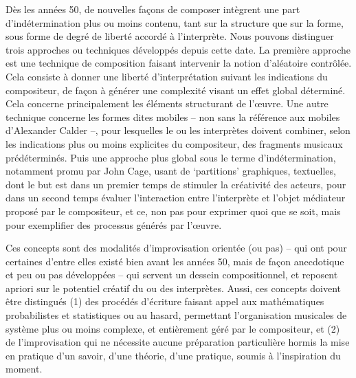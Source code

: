 \documentclass{article}
\begin{document}
Dès les années 50, de nouvelles façons de composer intègrent une part d'indétermination plus ou moins contenu, tant sur la structure que sur la forme, sous forme de degré de liberté accordé à l'interprète. Nous pouvons distinguer trois approches ou techniques développés depuis cette date. La première approche est une technique de composition faisant intervenir la notion d'aléatoire contrôlée. Cela consiste à donner une liberté d'interprétation suivant les indications du compositeur, de façon à générer une complexité visant un effet global déterminé. Cela concerne principalement les éléments structurant de l'œuvre. Une autre technique concerne les formes dites mobiles -- non sans la référence aux mobiles d'Alexander Calder --, pour lesquelles le ou les interprètes doivent combiner, selon les indications plus ou moins explicites du compositeur, des fragments musicaux prédéterminés. Puis une approche plus global sous le terme d'indétermination, notamment promu par John Cage, usant de `partitions' graphiques, textuelles, dont le but est dans un premier temps de stimuler la créativité des acteurs, pour dans un second temps évaluer l'interaction entre l'interprète et l'objet médiateur proposé par le compositeur, et ce, non pas pour exprimer quoi que se soit, mais pour exemplifier des processus générés par l'œuvre.

Ces concepts sont des modalités d'improvisation orientée (ou pas) -- qui ont pour certaines d'entre elles existé bien avant les années 50, mais de façon anecdotique et peu ou pas développées -- qui servent un dessein compositionnel, et reposent apriori sur le potentiel créatif du ou des interprètes.  Aussi, ces concepts doivent être distingués (1) des procédés d'écriture faisant appel aux mathématiques probabilistes et statistiques ou au hasard, permettant l'organisation musicales de système plus ou moins complexe, et entièrement géré par le compositeur, et (2) de l'improvisation qui ne nécessite aucune préparation particulière hormis la mise en pratique d'un savoir, d'une théorie, d'une pratique, soumis à l'inspiration du moment. %
\end{document}
